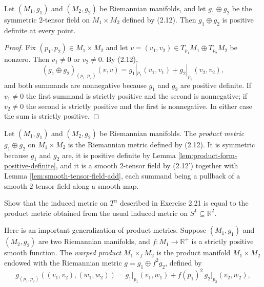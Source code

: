 \begin{lemma}
\label{lem:product-form-positive-definite}
\leanok
{}
Let $(M_1,g_1)$ and $(M_2,g_2)$ be Riemannian manifolds, and let $g_1 \oplus g_2$ be the symmetric $2$-tensor field on $M_1 \times M_2$ defined by (2.12). Then $g_1 \oplus g_2$ is positive definite at every point.
\end{lemma}

\begin{proof}
\leanok
{}
Fix $(p_1,p_2) \in M_1 \times M_2$ and let $v = (v_1,v_2) \in T_{p_1}M_1 \oplus T_{p_2}M_2$ be nonzero. Then $v_1 \neq 0$ or $v_2 \neq 0$. By (2.12),
\[
(g_1 \oplus g_2)_{(p_1,p_2)}(v,v) = g_1|_{p_1}(v_1,v_1) + g_2|_{p_2}(v_2,v_2),
\]
and both summands are nonnegative because $g_1$ and $g_2$ are positive definite. If $v_1 \neq 0$ the first summand is strictly positive and the second is nonnegative; if $v_2 \neq 0$ the second is strictly positive and the first is nonnegative. In either case the sum is strictly positive.
\end{proof}

\begin{definition}
\label{def:product-metric}
\leanok
{}
Let $(M_1,g_1)$ and $(M_2,g_2)$ be Riemannian manifolds. The \emph{product metric} $g_1 \oplus g_2$ on $M_1 \times M_2$ is the Riemannian metric defined by (2.12). It is symmetric because $g_1$ and $g_2$ are, it is positive definite by Lemma \ref{lem:product-form-positive-definite}, and it is a smooth $2$-tensor field by (2.12') together with Lemma \ref{lem:smooth-tensor-field-add}, each summand being a pullback of a smooth $2$-tensor field along a smooth map.
\end{definition}

\begin{exercise}
\label{exer:product-metric-torus}
Show that the induced metric on $T^n$ described in Exercise 2.21 is equal to the product metric obtained from the usual induced metric on $S^1 \subseteq \mathbb{R}^2$.
\end{exercise}

Here is an important generalization of product metrics. Suppose $(M_1, g_1)$ and $(M_2, g_2)$ are two Riemannian manifolds, and $f : M_1 \to \mathbb{R}^+$ is a strictly positive smooth function. The \emph{warped product} $M_1 \times_f M_2$ is the product manifold $M_1 \times M_2$ endowed with the Riemannian metric $g = g_1 \oplus f^2 g_2$, defined by
\begin{equation}
g_{(p_1,p_2)}((v_1, v_2), (w_1, w_2)) = g_1\big|_{p_1}(v_1, w_1) + f(p_1)^2 \, g_2\big|_{p_2}(v_2, w_2),
\end{equation}

